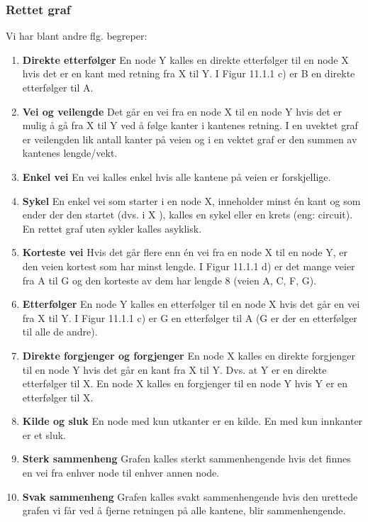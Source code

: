 \documentclass[11pt]{article}
\begin{document}
\newpage

        \subsubsection{Rettet graf}
            Vi har blant andre flg. begreper:
            \begin{enumerate}
                \item \textbf{Direkte etterfølger} En node Y kalles en direkte etterfølger til en node X hvis det er
                    en kant med retning fra X til Y. I Figur 11.1.1 c) er B en direkte etterfølger til A.
                \item \textbf{Vei og veilengde} Det går en vei fra en node X til en node Y hvis det er mulig å gå fra
                    X til Y ved å følge kanter i kantenes retning. I en uvektet graf er veilengden lik antall
                    kanter på veien og i en vektet graf er den summen av kantenes lengde/vekt.
                \item \textbf{Enkel vei} En vei kalles enkel hvis alle kantene på veien er forskjellige.
                \item \textbf{Sykel} En enkel vei som starter i en node X, inneholder minst én kant og som ender der
                    den startet (dvs. i X ), kalles en sykel eller en krets (eng: circuit). En rettet graf uten
                    sykler kalles asyklisk.
                \item \textbf{Korteste vei} Hvis det går flere enn én vei fra en node X til en node Y, er den veien
                    kortest som har minst lengde. I Figur 11.1.1 d) er det mange veier fra A til G og den
                    korteste av dem har lengde 8 (veien A, C, F, G).
                \item \textbf{Etterfølger} En node Y kalles en etterfølger til en node X hvis det går en vei fra X til Y.
                    I Figur 11.1.1 c) er G en etterfølger til A (G er der en etterfølger til alle de andre).
                \item \textbf{Direkte forgjenger og forgjenger} En node X kalles en direkte forgjenger til en
                    node Y hvis det går en kant fra X til Y. Dvs. at Y er en direkte etterfølger til X. En node
                    X kalles en forgjenger til en node Y hvis Y er en etterfølger til X.
                \item \textbf{Kilde og sluk} En node med kun utkanter er en kilde. En med kun innkanter er et sluk.
                \item \textbf{Sterk sammenheng} Grafen kalles sterkt sammenhengende hvis det finnes en vei fra
                    enhver node til enhver annen node.
                \item \textbf{Svak sammenheng} Grafen kalles svakt sammenhengende hvis den urettede grafen vi får
                    ved å fjerne retningen på alle kantene, blir sammenhengende.


\end{enumerate}
\end{document}
